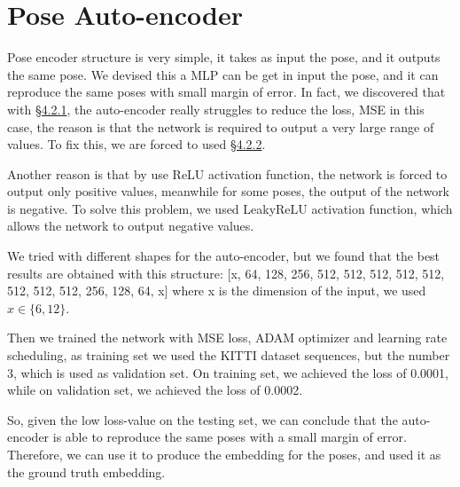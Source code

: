 \section{Pose Auto-encoder}\label{sec:pose-auto-encoder}
Pose encoder structure is very simple, it takes as input the pose, and it outputs the same pose.
We devised this a MLP can be get in input the pose, and it can reproduce the same poses with small margin of error.
In fact, we discovered that with \hyperref[subsec:directly-feeding-the-sequence]{\S4.2.1}, the auto-encoder really struggles to reduce the loss, MSE in this case, the reason is that the network is required to output a very large range of values.
To fix this, we are forced to used \hyperref[subsec:sequence-with-origin]{\S4.2.2}.

Another reason is that by use ReLU activation function, the network is forced to output only positive values, meanwhile for some poses, the output of the network is negative.
To solve this problem, we used LeakyReLU activation function, which allows the network to output negative values.

We tried with different shapes for the auto-encoder, but we found that the best results are obtained with this structure:
[x, 64, 128, 256, 512, 512, 512, 512, 512, 512, 512, 512, 256, 128, 64,  x]
where x is the dimension of the input, we used $x \in \{6, 12\}$.

Then we trained the network with MSE loss, ADAM optimizer and learning rate scheduling, as training set we used the KITTI dataset sequences, but the number 3, which is used as validation set.
On training set, we achieved the loss of 0.0001, while on validation set, we achieved the loss of 0.0002. %

So, given the low loss-value on the testing set, we can conclude that the auto-encoder is able to reproduce the same poses with a small margin of error.
Therefore, we can use it to produce the embedding for the poses, and used it as the ground truth embedding.
